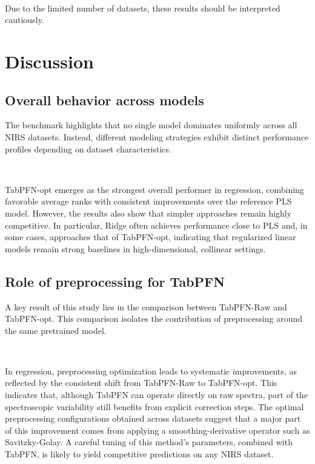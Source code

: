 \documentclass{article}
\begin{document}
~

Due to the limited number of datasets, these results should be interpreted cautiously.






\section{Discussion} \label{sec:discussion}

\subsection{Overall behavior across models}

The benchmark highlights that no single model dominates uniformly across all NIRS datasets. Instead, different modeling strategies exhibit distinct performance profiles depending on dataset characteristics.

~

TabPFN-opt emerges as the strongest overall performer in regression, combining favorable average ranks with consistent improvements over the reference PLS model. However, the results also show that simpler approaches remain highly competitive. In particular, Ridge often achieves performance close to PLS and, in some cases, approaches that of TabPFN-opt, indicating that regularized linear models remain strong baselines in high-dimensional, collinear settings.

\subsection{Role of preprocessing for TabPFN}

A key result of this study lies in the comparison between TabPFN-Raw and TabPFN-opt. This comparison isolates the contribution of preprocessing around the same pretrained model.

~

In regression, preprocessing optimization leads to systematic improvements, as reflected by the consistent shift from TabPFN-Raw to TabPFN-opt. This indicates that, although TabPFN can operate directly on raw spectra, part of the spectroscopic variability still benefits from explicit correction steps. The optimal preprocessing configurations obtained across datasets suggest that a major part of this improvement comes from applying a smoothing-derivative operator such as Savitzky-Golay. A careful tuning of this method's parameters, combined with TabPFN, is likely to yield competitive predictions on any NIRS dataset.
\end{document}
